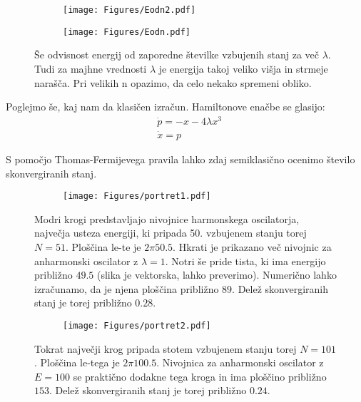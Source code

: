 \documentclass{article}
\begin{document}
\begin{figure}[H]
\centering
\begin{subfigure}{.49\textwidth}
\texttt{[image: Figures/Eodn2.pdf]}
\end{subfigure}
\begin{subfigure}{.49\textwidth}
\texttt{[image: Figures/Eodn.pdf]}
\end{subfigure}
\caption*{Še odvisnost energij od zaporedne številke vzbujenih stanj za več $\lambda$. Tudi za majhne vrednosti $\lambda$ je energija takoj veliko višja in strmeje narašča. Pri velikih n opazimo, da celo nekako spremeni obliko.}
\end{figure}

Poglejmo še, kaj nam da klasičen izračun. Hamiltonove enačbe se glasijo:
\begin{align*}
&\dot{p} = -x - 4 \lambda x^3 \\
&\dot{x} = p
\end{align*}

S pomočjo Thomas-Fermijevega pravila lahko zdaj semiklasično ocenimo število skonvergiranih stanj.

\begin{figure}[H]
\centering
\begin{subfigure}{.7\textwidth}
\texttt{[image: Figures/portret1.pdf]}
\end{subfigure}
\caption*{Modri krogi predstavljajo nivojnice harmonskega oscilatorja, največja usteza energiji, ki pripada 50. vzbujenem stanju torej $N=51$. Ploščina le-te je $ 2\pi 50.5$. Hkrati je prikazano več nivojnic za anharmonski oscilator z $\lambda=1$. Notri še pride tista, ki ima energijo približno $49.5$ (slika je vektorska, lahko preverimo). Numerično lahko izračunamo, da je njena ploščina približno $89$. Delež skonvergiranih stanj je torej približno $0.28$.}
\end{figure}

\begin{figure}[H]
\centering
\begin{subfigure}{.7\textwidth}
\texttt{[image: Figures/portret2.pdf]}
\end{subfigure}
\caption*{Tokrat največji krog pripada stotem vzbujenem stanju torej $N=101$. Ploščina le-tega je $ 2\pi 100.5$. Nivojnica za anharmonski oscilator z $E=100$ se praktično dodakne tega kroga in ima ploščino približno $153$. Delež skonvergiranih stanj je torej približno $0.24$.}
\end{figure}
\end{document}
